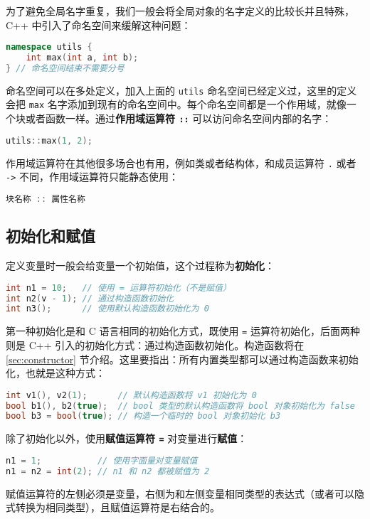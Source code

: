 \documentclass[hyperref,UTF8]{article}
\begin{document}
为了避免全局名字重复，我们一般会将全局对象的名字定义的比较长并且特殊，C++ 中引入了命名空间来缓解这种问题：
\begin{lstlisting}[language=c++]
namespace utils {
    int max(int a, int b);
} // 命名空间结束不需要分号
\end{lstlisting}
命名空间可以在多处定义，加入上面的 \texttt{utils} 命名空间已经定义过，这里的定义会把 \texttt{max} 名字添加到现有的命名空间中。每个命名空间都是一个作用域，就像一个块或者函数一样。通过\textbf{作用域运算符 \texttt{::}} 可以访问命名空间内部的名字：
\begin{lstlisting}[language=c++,numbers=none]
utils::max(1, 2);
\end{lstlisting}
作用域运算符在其他很多场合也有用，例如类或者结构体，和成员运算符 \texttt{.} 或者 \texttt{->} 不同，作用域运算符只能静态使用：
\begin{lstlisting}[language=c++,numbers=none]
块名称 :: 属性名称
\end{lstlisting}

\subsection{初始化和赋值}

定义变量时一般会给变量一个初始值，这个过程称为\textbf{初始化}：
\begin{lstlisting}[language=c++]
int n1 = 10;   // 使用 = 运算符初始化（不是赋值）
int n2(v - 1); // 通过构造函数初始化
int n3();      // 使用默认构造函数初始化为 0
\end{lstlisting}
第一种初始化是和 C 语言相同的初始化方式，既使用 \texttt{=} 运算符初始化，后面两种则是 C++ 引入的初始化方式：通过构造函数初始化。构造函数将在 \ref{sec:constructor} 节介绍。这里要指出：所有内置类型都可以通过构造函数来初始化，也就是这种方式：
\begin{lstlisting}[language=c++]
int v1(), v2(1);      // 默认构造函数将 v1 初始化为 0
bool b1(), b2(true);  // bool 类型的默认构造函数将 bool 对象初始化为 false
bool b3 = bool(true); // 构造一个临时的 bool 对象初始化 b3
\end{lstlisting}

除了初始化以外，使用\textbf{赋值运算符 \texttt{=}} 对变量进行\textbf{赋值}：
\begin{lstlisting}[language=c++]
n1 = 1;           // 使用字面量对变量赋值
n1 = n2 = int(2); // n1 和 n2 都被赋值为 2
\end{lstlisting}
赋值运算符的左侧必须是变量，右侧为和左侧变量相同类型的表达式（或者可以隐式转换为相同类型），且赋值运算符是右结合的。
\end{document}
